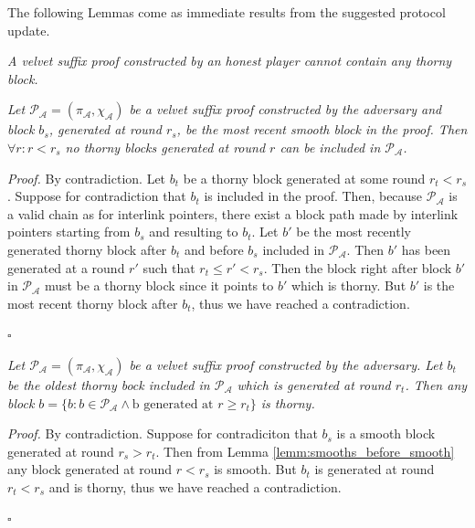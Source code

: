 The following Lemmas come as immediate results from the suggested protocol
update.\\

\begin{lemma}
	\textit{A velvet suffix proof constructed by an honest player cannot contain
	any thorny block.}
	\label{lemm:smooth_honest_suffix}
\end{lemma}

\begin{lemma} 
	\textit{Let $\mathcal{P_A} = (\pi_\mathcal{A}, \chi_\mathcal{A})$
	be a velvet suffix proof constructed by the adversary and block $b_s$, generated
	at round $r_s$, be the most recent smooth block in the proof. Then $\forall r:r < r_s$ no thorny blocks generated at round $r$ can be included in $\mathcal{P_A}$.}
	\label{lemm:smooths_before_smooth}
\end{lemma}
\textit{Proof.} By contradiction. Let $b_t$ be a thorny block generated at
some round $r_t < r_s$. Suppose for contradiction that $b_t$ is included in
the proof. Then, because $\mathcal{P_A}$ is a valid chain as for interlink
pointers, there exist a block path made by interlink pointers starting from $b_s$
and resulting to $b_t$. Let $b'$ be the most recently generated thorny block
after $b_t$ and before $b_s$ included in $\mathcal{P_A}$. 
Then $b'$ has been generated at a round $r'$ such that $r_t \leq r' < r_s$. Then
the block right after block $b'$ in $\mathcal{P_A}$ must be a thorny block since
it points to $b'$ which is thorny. But $b'$ is the most recent thorny block after
$b_t$, thus we have reached a contradiction.
\begin{flushright}
$\square$
\end{flushright}

\begin{lemma}
	\textit{Let $\mathcal{P_A} = (\pi_\mathcal{A}, \chi_\mathcal{A})$
	be a velvet suffix proof constructed by the adversary. Let $b_t$ be the oldest
	thorny bock included in $\mathcal{P_A}$ which is generated at round $r_t$. Then any block $b = \{b: b \in \mathcal{P_A} \wedge \text{b generated at }r \geq r_t \}$ is thorny.}
	\label{lemm:thorny_after_thorny}
\end{lemma}
\textit{Proof.} By contradiction. Suppose for contradiciton that $b_s$ is a smooth block generated at round $r_s > r_t$. Then from Lemma \ref{lemm:smooths_before_smooth} any block generated at round $r < r_s$ is smooth. But $b_t$ is generated at round $r_t < r_s$ and is thorny, thus we have reached a contradiction.
\begin{flushright}
$\square$
\end{flushright}

